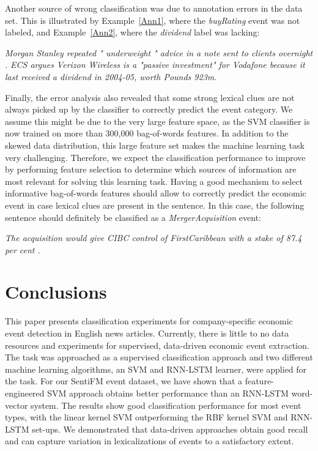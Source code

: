 \documentclass[11pt,a4paper]{article}
\begin{document}
Another source of wrong classification was due to annotation errors in the data set. This is illustrated by Example~\ref{Ann1}, where the \emph{buyRating} event was not labeled, and Example~\ref{Ann2}, where the \emph{dividend} label was lacking:

\begin{exe}
    \ex \emph{Morgan Stanley repeated " underweight " advice in a note sent to clients overnight .}\label{Ann1}
    \ex \emph{ECS argues Verizon Wireless is a "passive investment" for Vodafone because it last received a dividend in 2004-05, worth Pounds 923m.}\label{Ann2}
\end{exe}

Finally, the error analysis also revealed that some strong lexical clues are not always picked up by the classifier to correctly predict the event category. We assume this might be due to the very large feature space, as the SVM classifier is now trained on more than 300,000 bag-of-words features. In addition to the skewed data distribution, this large feature set makes the machine learning task very challenging. Therefore, we expect the classification performance to improve by performing feature selection to determine which sources of information are most relevant for solving this learning task. Having a good mechanism to select informative bag-of-words features should allow to correctly predict the economic event in case lexical clues are present in the sentence. In this case, the following sentence should definitely be classified as a \emph{MergerAcquisition} event:

\begin{exe}
    \ex \emph{The acquisition would give CIBC control of FirstCaribbean with a stake of 87.4 per cent .}
\end{exe}


\section{Conclusions} \label{sec:conclusions}

This paper presents classification experiments for company-specific economic event detection in English news articles.
Currently, there is little to no data resources and experiments for supervised, data-driven economic event extraction.
The task was approached as a supervised classification approach and two different machine learning algorithms, an SVM and RNN-LSTM learner, were applied for the task.
For our SentiFM event dataset, we have shown that a feature-engineered SVM approach obtains better performance than an RNN-LSTM word-vector system.
The results show good classification performance for most event types, with the linear kernel SVM outperforming the RBF kernel SVM and RNN-LSTM set-ups.
We demonstrated that data-driven approaches obtain good recall and can capture variation in lexicalizations of events to a satisfactory extent.
\end{document}

